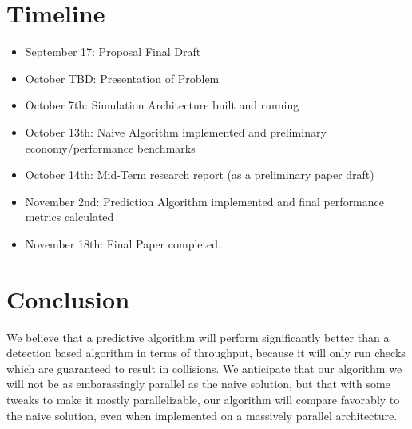 \documentclass{article}
\begin{document}
\section*{Timeline}

\begin{itemize}
	\item September 17: Proposal Final Draft
	\item October TBD:  Presentation of Problem
	\item October 7th:  Simulation Architecture built and running
	\item October 13th: Naive Algorithm implemented and preliminary economy/performance benchmarks
	\item October 14th: Mid-Term research report (as a preliminary paper draft)
	\item November 2nd: Prediction Algorithm implemented and final performance metrics calculated
	\item November 18th: Final Paper completed.
\end{itemize}

\section*{Conclusion}
We believe that a predictive algorithm will perform significantly better than a detection based algorithm in terms of throughput, because it will only run checks which are guaranteed to result in collisions.  We anticipate that our algorithm we will not be as embarassingly parallel as the naive solution, but
that with some tweaks to make it mostly parallelizable, our algorithm will compare favorably to the naive solution, even when implemented on a massively parallel architecture.
 



\end{document}
